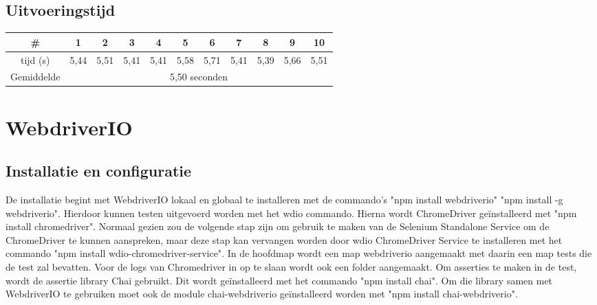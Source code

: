 \subsection{Uitvoeringstijd}


\begin{tabular}{ |c| |c |c |c |c |c |c |c |c |c |c| }
\hline
	\# & 1 & 2 & 3 & 4 & 5 & 6 & 7 & 8 & 9 & 10\\
\hline
	tijd (s) & 5,44 & 5,51 & 5,41 & 5,41 & 5,58 & 5,71 & 5,41 & 5,39 & 5,66 & 5,51\\
\hline
 Gemiddelde & \multicolumn{10}{c|}{5,50 seconden}\\
\hline
\end{tabular}


\clearpage
\section{WebdriverIO}
\subsection{Installatie en configuratie}
De installatie begint met WebdriverIO lokaal en globaal te installeren met de commando's "npm install webdriverio" "npm install -g webdriverio". Hierdoor kunnen testen uitgevoerd worden met het wdio commando. Hierna wordt ChromeDriver geïnstalleerd met "npm install chromedriver". Normaal gezien zou de volgende stap zijn om gebruik te maken van de Selenium Standalone Service om de ChromeDriver te kunnen aanspreken, maar deze stap kan vervangen worden door wdio ChromeDriver Service te installeren met het commando "npm install wdio-chromedriver-service". In de hoofdmap wordt een map webdriverio aangemaakt met daarin een map tests die de test zal bevatten. Voor de logs van Chromedriver in op te slaan wordt ook een folder aangemaakt. Om \glspl{assertie} te maken in de test, wordt de \gls{assertie} \gls{library} Chai gebruikt. Dit wordt geïnstalleerd met het commando "npm install chai". Om die \gls{library} samen met WebdriverIO te gebruiken moet ook de module chai-webdriverio geïnstalleerd worden met "npm install chai-webdriverio".

